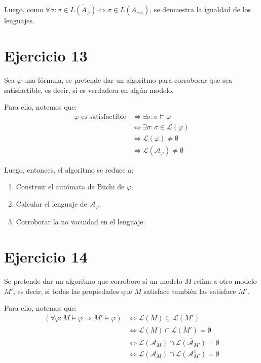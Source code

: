 \documentclass{article}
\begin{document}
Luego, como $\forall \sigma : \sigma \in \overline{L(A_\varphi)} \iff \sigma \in L(A_{\neg\varphi})$, se demuestra la igualdad de los lenguajes.

\section*{Ejercicio 13}
Sea $\varphi$ una fórmula, se pretende dar un algoritmo para corroborar que sea satisfactible, es decir, si es verdadera en algún modelo.

Para ello, notemos que:
\begin{equation*}
	\begin{aligned}
		\varphi \text{ es satisfactible} & \iff \exists \sigma : \sigma \vDash \varphi           \\
		                                 & \iff \exists \sigma : \sigma \in \mathcal{L}(\varphi) \\
		                                 & \iff \mathcal{L}(\varphi) \neq \emptyset              \\
		                                 & \iff \mathcal{L}(\mathcal{A_\varphi}) \neq \emptyset
	\end{aligned}
\end{equation*}

Luego, entonces, el algoritmo se reduce a:
\begin{enumerate}
	\item Construir el autómata de Büchi de $\varphi$.
	\item Calcular el lenguaje de $\mathcal{A}_\varphi$.
	\item Corroborar la no vacuidad en el lenguaje.
\end{enumerate}

\section*{Ejercicio 14}
Se pretende dar un algoritmo que corrobore si un modelo $M$ refina a otro modelo $M'$, es decir, si todas las propiedades que $M$ satisface también las satisface $M'$.

Para ello, notemos que:
\begin{equation*}
	\begin{aligned}
		(\forall \varphi : M \vDash \varphi \Rightarrow M' \vDash \varphi) & \iff \mathcal{L}(M) \subseteq \mathcal{L}(M')                                             \\
		                                                                   & \iff \mathcal{L}(M) \cap \overline{\mathcal{L}(M')} = \emptyset                           \\
		                                                                   & \iff \mathcal{L}(\mathcal{A}_M) \cap \overline{\mathcal{L}(\mathcal{A}_{M'})} = \emptyset \\
		                                                                   & \iff \mathcal{L}(\mathcal{A}_M) \cap \mathcal{L}(\mathcal{A}_{M'}^c) = \emptyset
	\end{aligned}
\end{equation*}
\end{document}
